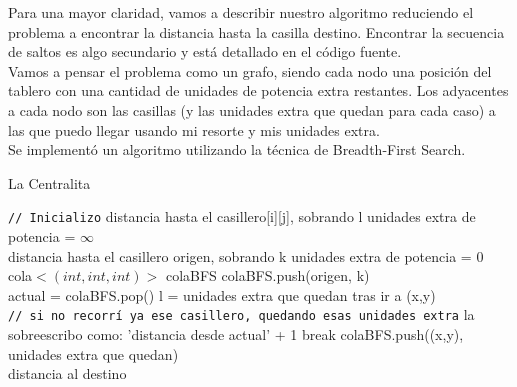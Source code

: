 \documentclass[11pt, a4paper, twoside]{article}
\begin{document}
{}
Para una mayor claridad, vamos a describir nuestro algoritmo reduciendo el problema a encontrar la distancia
hasta la casilla destino. Encontrar la secuencia de saltos es algo secundario y está detallado en el código fuente.\\
Vamos a pensar el problema como un grafo, siendo cada nodo una posición del tablero con una cantidad de unidades 
de potencia extra restantes. Los adyacentes a cada nodo son las casillas (y las unidades extra que quedan para 
cada caso) a las que puedo llegar usando mi resorte y mis unidades extra. \\
Se implementó un algoritmo utilizando la técnica de Breadth-First Search. \\

\begin{algorithm}[H]
\caption{La Centralita}\label{alg:ej3-centralita}
\begin{algorithmic}[1]

\Statex \texttt{// Inicializo}
	  
		\State distancia hasta el casillero[i][j], sobrando l unidades extra de potencia = $\infty$
	\EndFor \\

\State distancia hasta el casillero origen, sobrando k unidades extra de potencia = 0 \\
\State cola$<(int, int, int)>$ colaBFS
\State colaBFS.push(origen, k) \\

   
\State actual = colaBFS.pop()
		    \State l = unidades extra que quedan tras ir a (x,y) \\
			\Statex \hspace{1cm} \texttt{// si no recorrí ya ese casillero, quedando esas unidades extra}
				\State   la sobreescribo como: 'distancia desde actual' + 1
					\State break
				\EndIf
				\State colaBFS.push((x,y), unidades extra que quedan)
			\EndIf	
	\EndFor		
\EndWhile
\\
\State \Return distancia al destino

\end{algorithmic}
\end{algorithm}
\end{document}
